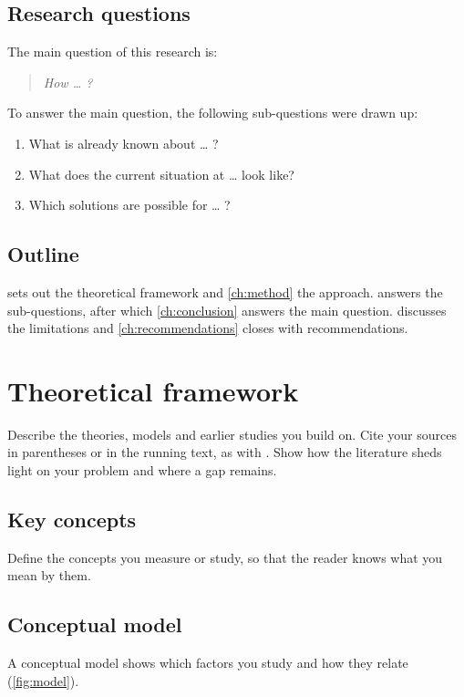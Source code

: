 \documentclass[11pt, a4paper, oneside]{report}
\begin{document}
\section{Research questions}
\label{sec:questions}
The main question of this research is:

\begin{quote}
  \itshape How \ldots{} ?
\end{quote}

To answer the main question, the following sub-questions were drawn up:
\begin{enumerate}[label=\arabic*.]
  \item What is already known about \ldots{} ?
  \item What does the current situation at \ldots{} look like?
  \item Which solutions are possible for \ldots{} ?
\end{enumerate}

\section{Outline}
 sets out the theoretical framework and \cref{ch:method}
the approach.  answers the sub-questions, after which
\cref{ch:conclusion} answers the main question. 
discusses the limitations and \cref{ch:recommendations} closes with
recommendations.

\chapter{Theoretical framework}
\label{ch:theory}
Describe the theories, models and earlier studies you build on. Cite your
sources in parentheses \parencite{creswell2018} or in the running text,
as with \textcite{booth2016}. Show how the literature sheds light on your
problem and where a gap remains.

\section{Key concepts}
Define the concepts you measure or study, so that the reader knows what
you mean by them.

\section{Conceptual model}
A conceptual model shows which factors you study and how they relate
(\cref{fig:model}).
\end{document}
